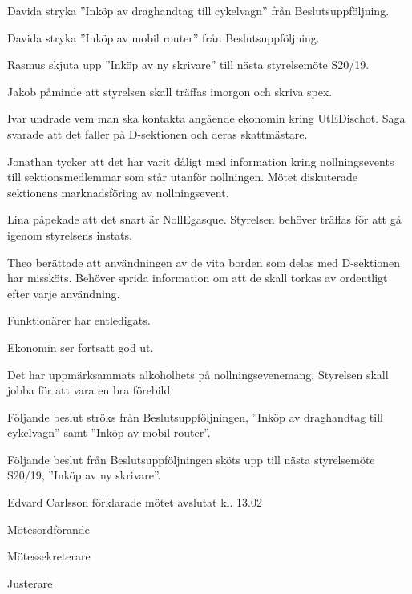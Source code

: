 \documentclass[10pt]{article}
\def\mo{Edvard Carlsson}
\def\ms{Mattias Lundström}
\def\ji{Theo Nyman}
\begin{document}
\begin{paragrafer}
Davida \ypa stryka ''Inköp av draghandtag till cykelvagn'' från Beslutsuppföljning.

\Mbaby

Davida \ypa stryka ''Inköp av mobil router'' från Beslutsuppföljning.

\Mbaby

Rasmus \ypa skjuta upp ''Inköp av ny skrivare'' till nästa styrelsemöte S20/19.

\Mbaby 



Jakob påminde att styrelsen skall träffas imorgon och skriva spex.

Ivar undrade vem man ska kontakta angående ekonomin kring UtEDischot. Saga svarade att det faller på D-sektionen och deras skattmästare. 

Jonathan tycker att det har varit dåligt med information kring nollningsevents till sektionsmedlemmar som står utanför nollningen. 
Mötet diskuterade sektionens marknadsföring av nollningsevent.  

Lina påpekade att det snart är NollEgasque. Styrelsen behöver träffas för att gå igenom styrelsens instats. 

Theo berättade att användningen av de vita borden som delas med D-sektionen har missköts. Behöver sprida information om att de skall torkas av ordentligt efter varje användning. 

Funktionärer har entledigats.

Ekonomin ser fortsatt god ut. 

Det har uppmärksammats alkoholhets på nollningsevenemang. Styrelsen skall jobba för att vara en bra förebild.

Följande beslut ströks från Beslutsuppföljningen, ''Inköp av draghandtag till cykelvagn'' samt ''Inköp av mobil router''.  

Följande beslut från Beslutsuppföljningen sköts upp till nästa styrelsemöte S20/19, ''Inköp av ny skrivare''.


{\mo} förklarade mötet avslutat kl. 13.02
\end{paragrafer}

\hidesignfoot
\begin{signatures}{3}
\signature{\mo}{Mötesordförande}
\signature{\ms}{Mötessekreterare}
\signature{\ji}{Justerare}
\end{signatures}
\end{document}
